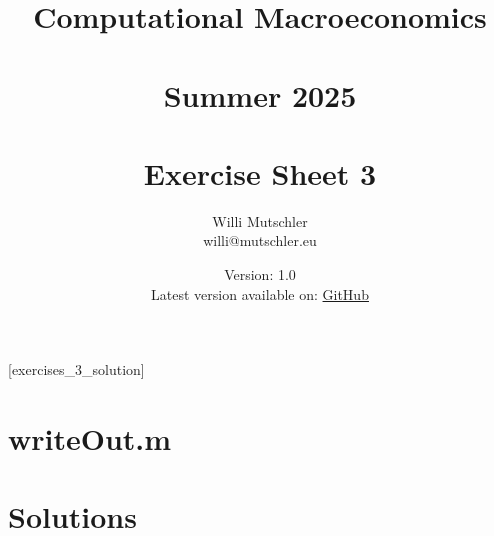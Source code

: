 
\newif\ifDisplaySolutions\DisplaySolutionstrue%


\title{Computational Macroeconomics\\~\\Summer 2025\\~\\Exercise Sheet 3}
\author{Willi Mutschler\\willi@mutschler.eu}
\date{Version: 1.0\\Latest version available on: \href{https://github.com/wmutschl/Computational-Macroeconomics/releases/latest/download/exercises_3.pdf}{GitHub}}
\maketitle\thispagestyle{empty}

\newpage
{}[exercises_3_solution]
\tableofcontents\thispagestyle{empty}\newpage

\setcounter{page}{1}
\newpage
\newpage
\newpage
\newpage

\appendix
\section{writeOut.m\label{app:writeOut}}


\printbibliography%
\newpage

\ifDisplaySolutions%
\newpage
\appendix
\section{Solutions}

\fi
